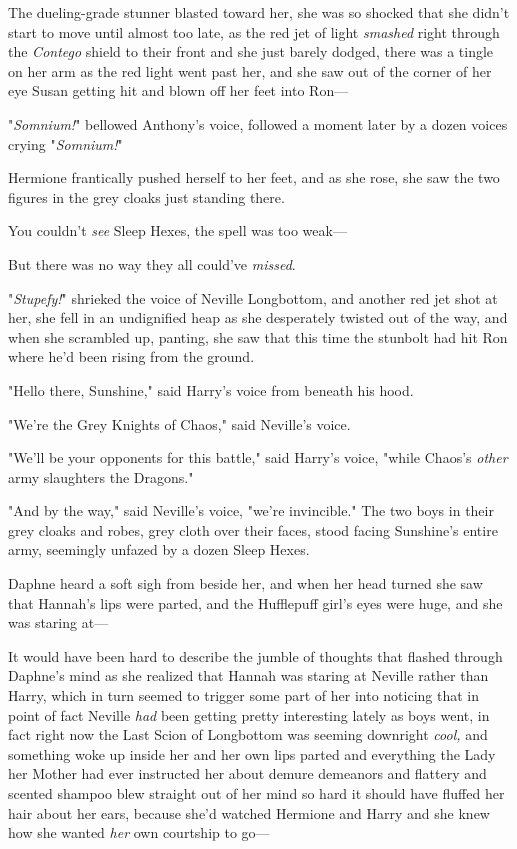 The dueling-grade stunner blasted toward her, she was so shocked that she
didn't start to move until almost too late, as the red jet of light
\emph{smashed} right through the \emph{Contego} shield to their front and she
just barely dodged, there was a tingle on her arm as the red light went past
her, and she saw out of the corner of her eye Susan getting hit and blown off
her feet into Ron---

"\emph{Somnium!}" bellowed Anthony's voice, followed a moment later by a dozen
voices crying "\emph{Somnium!}"

Hermione frantically pushed herself to her feet, and as she rose, she saw the
two figures in the grey cloaks just standing there.

You couldn't \emph{see} Sleep Hexes, the spell was too weak---

But there was no way they all could've \emph{missed}.

"\emph{Stupefy!}" shrieked the voice of Neville Longbottom, and another red jet
shot at her, she fell in an undignified heap as she desperately twisted out of
the way, and when she scrambled up, panting, she saw that this time the
stunbolt had hit Ron where he'd been rising from the ground.

"Hello there, Sunshine," said Harry's voice from beneath his hood.

"We're the Grey Knights of Chaos," said Neville's voice.

"We'll be your opponents for this battle," said Harry's voice, "while Chaos's
\emph{other} army slaughters the Dragons."

"And by the way," said Neville's voice, "we're invincible."
\later
The two boys in their grey cloaks and robes, grey cloth over their faces, stood
facing Sunshine's entire army, seemingly unfazed by a dozen Sleep Hexes.

Daphne heard a soft sigh from beside her, and when her head turned she saw that
Hannah's lips were parted, and the Hufflepuff girl's eyes were huge, and she
was staring at---

It would have been hard to describe the jumble of thoughts that flashed through
Daphne's mind as she realized that Hannah was staring at Neville rather than
Harry, which in turn seemed to trigger some part of her into noticing that in
point of fact Neville \emph{had} been getting pretty interesting lately as boys
went, in fact right now the Last Scion of Longbottom was seeming downright
\emph{cool,} and something woke up inside her and her own lips parted and
everything the Lady her Mother had ever instructed her about demure demeanors
and flattery and scented shampoo blew straight out of her mind so hard it
should have fluffed her hair about her ears, because she'd watched Hermione and
Harry and she knew how she wanted \emph{her} own courtship to go---

